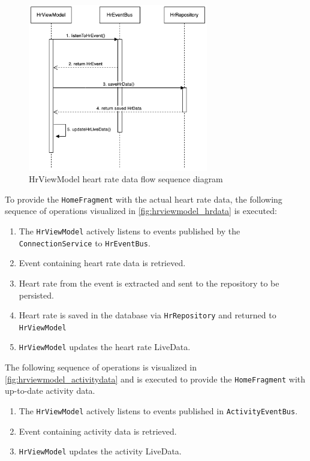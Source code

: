 \begin{figure}[H]
    \centering
    \includegraphics[width=0.7\textwidth]{diagrams/hrviewmodel-hr.drawio.png}
    \caption{HrViewModel heart rate data flow sequence diagram}
    \label{fig:hrviewmodel_hrdata}
\end{figure}

To provide the \texttt{HomeFragment} with the actual heart rate data, the following sequence of operations visualized in \autoref{fig:hrviewmodel_hrdata} is executed:
\begin{enumerate}
    \item The \texttt{HrViewModel} actively listens to events published by the \texttt{ConnectionService} to \texttt{HrEventBus}.
    \item Event containing heart rate data is retrieved.
    \item Heart rate from the event is extracted and sent to the repository to be persisted.
    \item Heart rate is saved in the database via \texttt{HrRepository} and returned to \texttt{HrViewModel}
    \item \texttt{HrViewModel} updates the heart rate LiveData.
\end{enumerate}

The following sequence of operations is visualized in \autoref{fig:hrviewmodel_activitydata} and is executed to provide the \texttt{HomeFragment} with up-to-date activity data.
\begin{enumerate}
    \item The \texttt{HrViewModel} actively listens to events published in \texttt{ActivityEventBus}.
    \item Event containing activity data is retrieved.
    \item \texttt{HrViewModel} updates the activity LiveData.
\end{enumerate}

